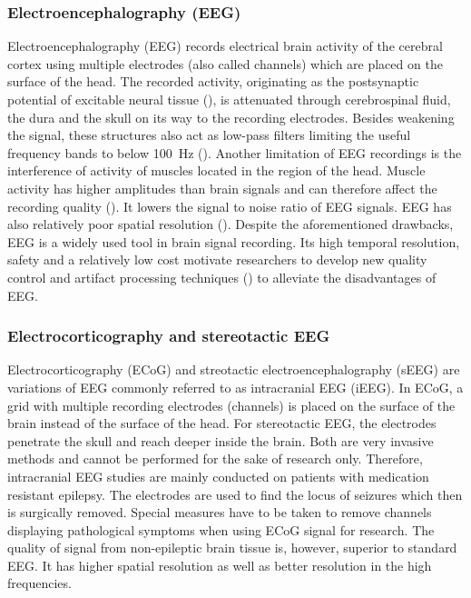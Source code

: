 \subsubsection{Electroencephalography (EEG)}
Electroencephalography (EEG) records electrical brain activity of the cerebral cortex using multiple electrodes (also called channels) which are placed on the surface of the head. The recorded activity, originating as the postsynaptic potential of excitable neural tissue (\cite{buzsaki-origin-2012}), is attenuated through cerebrospinal fluid, the dura and the skull on its way to the recording electrodes. Besides weakening the signal, these structures also act as low-pass filters limiting the useful frequency bands to below 100~Hz (\cite{tam-human-2019}). Another limitation of EEG recordings is the interference of activity of muscles located in the region of the head. Muscle activity has higher amplitudes than brain signals and can therefore affect the recording quality (\cite{scholg-presence-2002}). It lowers the signal to noise ratio of EEG signals. EEG has also relatively poor spatial resolution (\cite{buzsaki-origin-2012}). Despite the aforementioned drawbacks, EEG is a widely used tool in brain signal recording. Its high temporal resolution, safety and a relatively low cost motivate researchers to develop new quality control and artifact processing techniques (\cite{lotte2018review}) to alleviate the disadvantages of EEG. 

\subsubsection{Electrocorticography and stereotactic EEG}
Electrocorticography (ECoG) and streotactic electroencephalography (sEEG) are variations of EEG commonly referred to as intracranial EEG (iEEG).
In ECoG, a grid with multiple recording electrodes (channels) is placed on the surface of the brain instead of the surface of the head.
For stereotactic EEG, the electrodes penetrate the skull and reach deeper inside the brain. Both are very invasive methods and cannot be performed for the sake of research only.
Therefore, intracranial EEG studies are mainly conducted on patients with medication resistant epilepsy.
The electrodes are used to find the locus of seizures which then is surgically removed. Special measures have to be taken to remove channels displaying pathological symptoms when using ECoG signal for research.
The quality of signal from non-epileptic brain tissue is, however, superior to standard EEG. It has higher spatial resolution as well as better resolution in the high frequencies.

